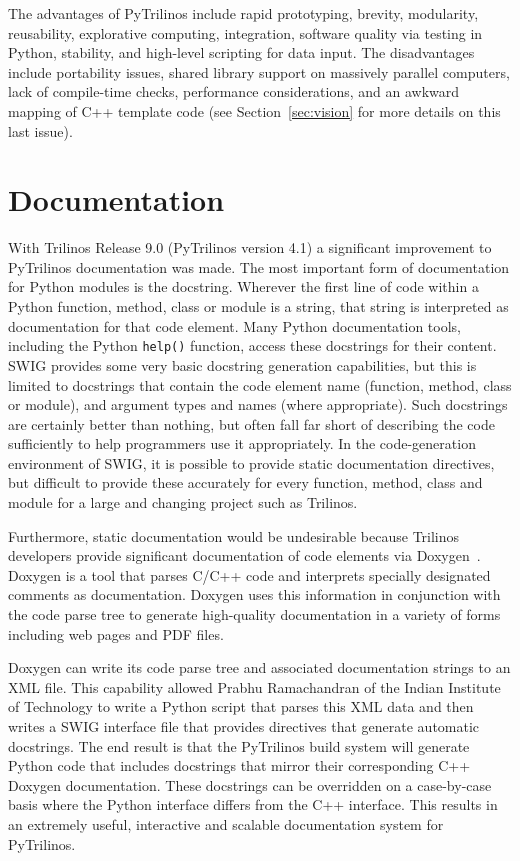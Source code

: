\documentclass[11pt]{article}
\begin{document}
The advantages of PyTrilinos include rapid prototyping, brevity, modularity, reusability, explorative computing, integration, software quality via testing in Python, stability, and high-level scripting for data input.  The disadvantages include portability issues, shared library support on massively parallel computers, lack of compile-time checks, performance considerations, and an awkward mapping of C++ template code (see Section~\ref{sec:vision} for more details on this last issue).

\section{Documentation}
\label{sec:documentation}

With Trilinos Release 9.0 (PyTrilinos version 4.1) a significant improvement to PyTrilinos documentation was made.  The most important form of documentation for Python modules is the docstring.  Wherever the first line of code within a Python function, method, class or module is a string, that string is interpreted as documentation for that code element.  Many Python documentation tools, including the Python {\tt help()} function, access these docstrings for their content.  SWIG provides some very basic docstring generation capabilities, but this is limited to docstrings that contain the code element name (function, method, class or module), and argument types and names (where appropriate).  Such docstrings are certainly better than nothing, but often fall far short of describing the code sufficiently to help programmers use it appropriately.  In the code-generation environment of SWIG, it is possible to provide static documentation directives, but difficult to provide these accurately for every function, method, class and module for a large and changing project such as Trilinos.

Furthermore, static documentation would be undesirable because Trilinos developers provide significant documentation of code elements via Doxygen~\cite{Doxygen}.  Doxygen is a tool that parses C/C++ code and interprets specially designated comments as documentation.  Doxygen uses this information in conjunction with the code parse tree to generate high-quality documentation in a variety of forms including web pages and PDF files.

Doxygen can write its code parse tree and associated documentation strings to an XML file.  This capability allowed Prabhu Ramachandran of the Indian Institute of Technology to write a Python script that parses this XML data and then writes a SWIG interface file that provides directives that generate automatic docstrings.  The end result is that the PyTrilinos build system will generate Python code that includes docstrings that mirror their corresponding C++ Doxygen documentation.  These docstrings can be overridden on a case-by-case basis where the Python interface differs from the C++ interface.  This results in an extremely useful, interactive and scalable documentation system for PyTrilinos.
\end{document}
